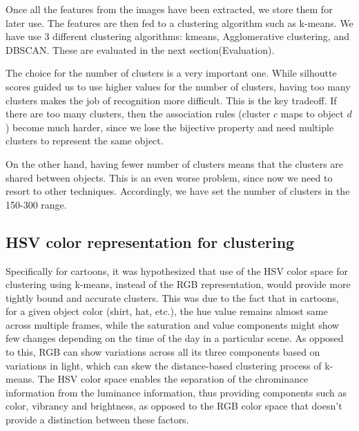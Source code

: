 \documentclass[10pt,twocolumn,letterpaper]{article}
\begin{document}
Once all the features from the images have been extracted, we store
them for later use. The features are then fed to a clustering
algorithm such as k-means. We have use 3 different clustering
algorithms: kmeans, Agglomerative clustering, and DBSCAN. These are
evaluated in the next section(Evaluation).

The choice for the number of clusters is a very important one. While
silhoutte scores guided us to use higher values for the number of
clusters, having too many clusters makes the job of recognition more
difficult. This is the key tradeoff. If there are too many clusters,
then the association rules (cluster $c$ maps to object $d$) become
much harder, since we lose the bijective property and need multiple
clusters to represent the same object.

On the other hand, having fewer number of clusters means that the
clusters are shared between objects. This is an even worse problem,
since now we need to resort to other techniques. Accordingly, we have
set the number of clusters in the 150-300 range.


\subsection{HSV color representation for clustering}



Specifically for cartoons, it was hypothesized that use of the HSV
color space for clustering using k-means, instead of the RGB
representation, would provide more tightly bound and accurate
clusters.  This was due to the fact that in cartoons, for a given
object color (shirt, hat, etc.), the hue value remains almost same
across multiple frames, while the saturation and value components
might show few changes depending on the time of the day in a
particular scene. As opposed to this, RGB can show variations across
all its three components based on variations in light, which can skew
the distance-based clustering process of k-means. The HSV color space
enables the separation of the chrominance information from the
luminance information, thus providing components such as color,
vibrancy and brightness, as opposed to the RGB color space that
doesn’t provide a distinction between these factors.
\end{document}
